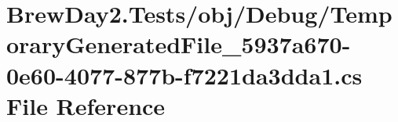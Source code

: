 \hypertarget{_brew_day2_8_tests_2obj_2_debug_2_temporary_generated_file__5937a670-0e60-4077-877b-f7221da3dda1_8cs}{}\section{Brew\+Day2.\+Tests/obj/\+Debug/\+Temporary\+Generated\+File\+\_\+5937a670-\/0e60-\/4077-\/877b-\/f7221da3dda1.cs File Reference}
\label{_brew_day2_8_tests_2obj_2_debug_2_temporary_generated_file__5937a670-0e60-4077-877b-f7221da3dda1_8cs}
